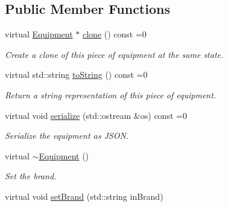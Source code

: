 \subsection*{Public Member Functions}
\begin{DoxyCompactItemize}
\item 
\hypertarget{class_equipment_a5c6929939d117e84e182e21a62a7723a}{}virtual \hyperlink{class_equipment}{Equipment} $\ast$ \hyperlink{class_equipment_a5c6929939d117e84e182e21a62a7723a}{clone} () const  =0\label{class_equipment_a5c6929939d117e84e182e21a62a7723a}

\begin{DoxyCompactList}\small\item\em Create a clone of this piece of equipment at the same state. \end{DoxyCompactList}\item 
\hypertarget{class_equipment_a970f5be54182c0067cb2cbb72c0029b6}{}virtual std\+::string \hyperlink{class_equipment_a970f5be54182c0067cb2cbb72c0029b6}{to\+String} () const  =0\label{class_equipment_a970f5be54182c0067cb2cbb72c0029b6}

\begin{DoxyCompactList}\small\item\em Return a string representation of this piece of equipment. \end{DoxyCompactList}\item 
\hypertarget{class_equipment_adc36912d637c7c445db05cab803abeb3}{}virtual void \hyperlink{class_equipment_adc36912d637c7c445db05cab803abeb3}{serialize} (std\+::ostream \&os) const  =0\label{class_equipment_adc36912d637c7c445db05cab803abeb3}

\begin{DoxyCompactList}\small\item\em Serialize the equipment as J\+S\+O\+N. \end{DoxyCompactList}\item 
\hypertarget{class_equipment_a7547b5114f15bb1bdc4ddc1c14da3c8d}{}virtual \hyperlink{class_equipment_a7547b5114f15bb1bdc4ddc1c14da3c8d}{$\sim$\+Equipment} ()\label{class_equipment_a7547b5114f15bb1bdc4ddc1c14da3c8d}

\begin{DoxyCompactList}\small\item\em Set the brand. \end{DoxyCompactList}\item 
\hypertarget{class_equipment_a15b661908f1f70cb15e910d59c879b01}{}virtual void \hyperlink{class_equipment_a15b661908f1f70cb15e910d59c879b01}{set\+Brand} (std\+::string in\+Brand)\label{class_equipment_a15b661908f1f70cb15e910d59c879b01}


\end{DoxyCompactItemize}
